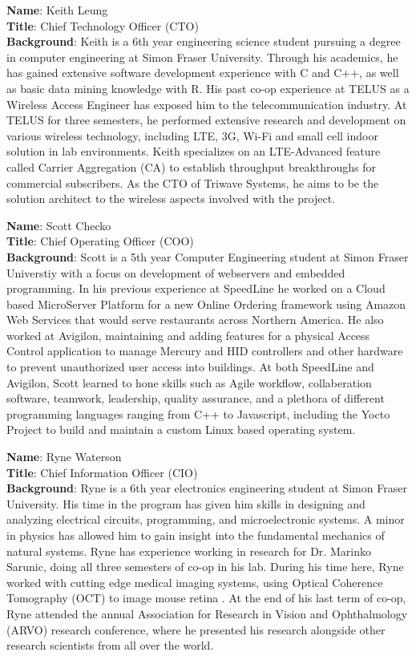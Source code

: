 \bigskip
\bigskip
\textbf{Name}:  Keith Leung\\
\medskip
\textbf{Title}: Chief Technology Officer (CTO) \\
\medskip
\textbf{Background}:
Keith is a 6th year engineering science student pursuing a degree in computer engineering at Simon Fraser University. Through his academics, he has gained extensive software development experience with C and C++, as well as basic data mining knowledge with R. His past co-op experience at TELUS as a Wireless Access Engineer has exposed him to the telecommunication industry. At TELUS for three semesters, he performed extensive research and development on various wireless technology, including LTE, 3G, Wi-Fi and small cell indoor solution in lab environments. Keith specializes on an LTE-Advanced feature called Carrier Aggregation (CA) to establish throughput breakthroughs for commercial subscribers. As the CTO of Triwave Systems, he aims to be the solution architect to the wireless aspects involved with the project.

\pagebreak
\textbf{Name}: Scott Checko\\
\medskip
\textbf{Title}: Chief Operating Officer (COO)\\
\medskip
\textbf{Background}:
Scott is a 5th year Computer Engineering student at Simon Fraser Universtiy with a focus on development of webservers and embedded programming.
In his previous experience at SpeedLine he worked on a Cloud based MicroServer Platform for a new Online Ordering framework using Amazon Web Services that would serve restaurants across Northern America.
He also worked at Avigilon, maintaining and adding features for a physical Access Control application to manage Mercury and HID controllers and other hardware to prevent unauthorized user access into buildings.
At both SpeedLine and Avigilon, Scott learned to hone skills such as Agile workflow, collaberation software, teamwork, leadership, quality assurance, and a plethora of different programming languages ranging from C++ to Javascript, including the Yocto Project to build and maintain a custom Linux based operating system.

\bigskip
\bigskip
\textbf{Name}: Ryne Waterson\\
\medskip
\textbf{Title}: Chief Information Officer (CIO)\\
\medskip
\textbf{Background}: Ryne is a 6th year electronics engineering student at Simon Fraser University. His time in the program has given him skills in designing and analyzing electrical circuits, programming, and microelectronic systems. A minor in physics has allowed him to gain insight into the fundamental mechanics of natural systems. Ryne has experience working in research for Dr. Marinko Sarunic, doing all three semesters of co-op in his lab. During his time here, Ryne worked with cutting edge medical imaging systems, using Optical Coherence Tomography (OCT) to image mouse retina . At the end of his last term of co-op, Ryne attended the annual Association for Research in Vision and Ophthalmology (ARVO) research conference, where he presented his research alongside other research scientists from all over the world.  

